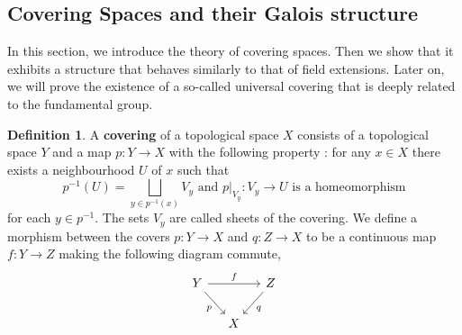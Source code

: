 \documentclass{article}
\theoremstyle{plain}
\theoremstyle{definition}
\newtheorem{definition}[theorem]{Definition}
\begin{document}
\subsection{Covering Spaces and their Galois structure}
\label{fund_grp_cov_spaces}

In this section, we introduce the theory of covering spaces. 
Then we show that it exhibits a structure that behaves similarly to that of field extensions. 
Later on, we will prove the existence of a so-called universal covering that is deeply related to the fundamental group.

\label{covering_spaces}
\begin{definition}
\label{def_cover}
    A \textbf{covering} of a topological space $X$ consists of a topological space $Y$ and a map $p:Y\rightarrow X$ with the following property : for any $x\in X$ there exists a neighbourhood $U$ of $x$ such that 
    $$p^{-1}(U) = \bigsqcup_{y\in p^{-1}(x)} V_y  \text{ and } p\vert_{V_y}:V_y\rightarrow U \text{ is a homeomorphism}$$
    for each $y\in p^{-1}$. The sets $V_y$ are called sheets of the covering. We define a morphism between the covers $p:Y\rightarrow X$ and $q:Z\rightarrow X$ to be a continuous map $f:Y\rightarrow Z$ making the following diagram commute,
 \[
    \begin{tikzcd}[column sep=small]
        Y \arrow[rd,"p"'] \arrow[rr,"f"]   &   &Z \arrow[ld,"q"]\\
          & X      
    \end{tikzcd}
    \]
\end{definition}
\end{document}
